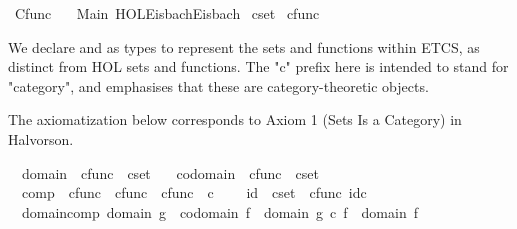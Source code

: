 %
\begin{isabellebody}%
%
%
\isadelimdocument
%
\endisadelimdocument
%
\isatagdocument
%
\isamarkuptrue%
%
\endisatagdocument
{\isafolddocument}%
%
\isadelimdocument
%
\endisadelimdocument
%
\isadelimtheory
%
\endisadelimtheory
%
\isatagtheory
{}\isamarkupfalse%
\ Cfunc\isanewline
\ \ \ Main\ {\isachardoublequoteopen}HOL{\isacharminus}{\kern0pt}Eisbach{\isachardot}{\kern0pt}Eisbach{\isachardoublequoteclose}\isanewline
{}%
\endisatagtheory
{\isafoldtheory}%
%
\isadelimtheory
\isanewline
%
\endisadelimtheory
\isanewline
{}\isamarkupfalse%
\ cset\isanewline
{}\isamarkupfalse%
\ cfunc%
\begin{isamarkuptext}%
We declare  and  as types to represent the sets and functions within
  ETCS, as distinct from HOL sets and functions.
  The "c" prefix here is intended to stand for "category", and emphasises that these are
  category-theoretic objects.%
\end{isamarkuptext}\isamarkuptrue%
%
\begin{isamarkuptext}%
The axiomatization below corresponds to Axiom 1 (Sets Is a Category) in Halvorson.%
\end{isamarkuptext}\isamarkuptrue%
\isamarkupfalse%
\isanewline
\ \ domain\ {\isacharcolon}{\kern0pt}{\isacharcolon}{\kern0pt}\ {\isachardoublequoteopen}cfunc\ {\isasymRightarrow}\ cset{\isachardoublequoteclose}\ \isanewline
\ \ codomain\ {\isacharcolon}{\kern0pt}{\isacharcolon}{\kern0pt}\ {\isachardoublequoteopen}cfunc\ {\isasymRightarrow}\ cset{\isachardoublequoteclose}\ \isanewline
\ \ comp\ {\isacharcolon}{\kern0pt}{\isacharcolon}{\kern0pt}\ {\isachardoublequoteopen}cfunc\ {\isasymRightarrow}\ cfunc\ {\isasymRightarrow}\ cfunc{\isachardoublequoteclose}\ {\isacharparenleft}{\kern0pt}\ {\isachardoublequoteopen}{\isasymcirc}\isactrlsub c{\isachardoublequoteclose}\ {}{}{\isacharparenright}{\kern0pt}\ \isanewline
\ \ id\ {\isacharcolon}{\kern0pt}{\isacharcolon}{\kern0pt}\ {\isachardoublequoteopen}cset\ {\isasymRightarrow}\ cfunc{\isachardoublequoteclose}\ {\isacharparenleft}{\kern0pt}{\isachardoublequoteopen}id\isactrlsub c{\isachardoublequoteclose}{\isacharparenright}{\kern0pt}\ \isanewline
{}\isanewline
\ \ domain{\isacharunderscore}{\kern0pt}comp{\isacharcolon}{\kern0pt}\ {\isachardoublequoteopen}domain\ g\ {\isacharequal}{\kern0pt}\ codomain\ f\ {\isasymLongrightarrow}\ domain\ {\isacharparenleft}{\kern0pt}g\ {\isasymcirc}\isactrlsub c\ f{\isacharparenright}{\kern0pt}\ {\isacharequal}{\kern0pt}\ domain\ f{\isachardoublequoteclose}\ \isanewline

\end{isabellebody}

